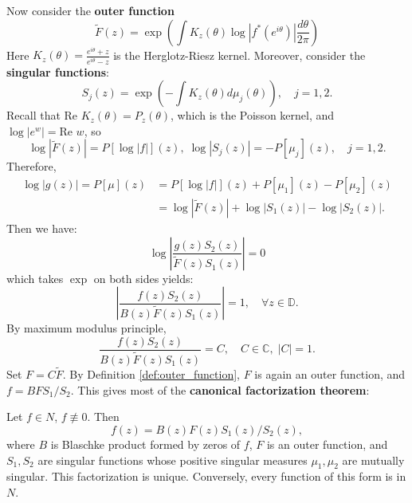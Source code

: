 Now consider the \textbf{outer function}
\begin{equation*}
  \tilde{F}(z)=\exp\left(\int K_z(\theta)\log |f^*(e^{i\theta})|\frac{d\theta}{2\pi}\right)
\end{equation*}
Here $K_z(\theta)=\frac{e^{i\theta}+z}{e^{i\theta}-z}$ is the Herglotz-Riesz kernel. Moreover, consider
the \textbf{singular functions}:
\begin{equation*}
  S_j(z)=\exp\left(-\int K_z(\theta)d\mu_j(\theta)\right),\quad j=1,2.
\end{equation*}
Recall that $\text{Re } K_z(\theta)=P_z(\theta)$, which is the Poisson kernel, and
$\log |e^w|=\text{Re } w$, so 
\begin{equation*}
  \log |\tilde{F}(z)|=P[\log |f|](z),\; \log |S_j(z)|=- P[\mu_j](z),\quad j=1,2.
\end{equation*}
Therefore, 
\begin{align*}
  \log |g(z)|=P[\mu](z)&=P[\log |f|](z)+P[\mu_1](z)-P[\mu_2](z)\\
  &= \log |\tilde{F}(z)|+\log |S_1(z)|-\log|S_2(z)|.
\end{align*}
Then we have:
\begin{equation*}
  \log \left|\frac{g(z) S_2(z)}{\tilde{F}(z)S_1(z)}\right|=0
\end{equation*}
which takes $\exp$ on both sides yields:
\begin{equation*}
  \left|\frac{f(z)S_2(z)}{B(z)\tilde{F}(z)S_1(z)}\right|=1,\quad \forall z\in \mathbb{D}.
\end{equation*}
By maximum modulus principle, 
\begin{equation*}
  \frac{f(z)S_2(z)}{B(z)\tilde{F}(z)S_1(z)}=C,\quad C\in\mathbb{C},\; |C|=1.
\end{equation*}
Set $F=C\tilde{F}$. By Definition \ref{def:outer_function}, $F$ is again an outer function, and
$f=BFS_1/S_2$.
This gives most of the \textbf{canonical factorization theorem}:
\begin{theorem}
Let $f\in N$, $f\not\equiv 0$. Then
\begin{equation*}
  f(z)=B(z)F(z)S_1(z)/S_2(z),
\end{equation*}
where $B$ is Blaschke product formed by zeros of $f$,
$F$ is an outer function, and $S_1,S_2$ are
singular functions whose positive singular measures $\mu_1,\mu_2$ are mutually singular.
This factorization is unique.
Conversely, every function of this form is in $N$.
\end{theorem}
